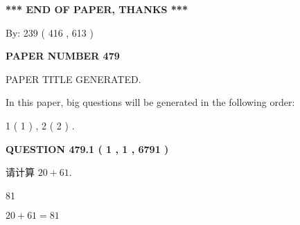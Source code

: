 \documentclass{ctexart}
\begin{document}
   
   
   
\vspace{1.0in} 
{\textbf{\large{ *** END OF PAPER, THANKS *** }}} 
   
   
\hspace{1.0in} By: 
 239 ( 416 ,  613 )
   
   
   
   
\newpage 
\setcounter{page}{ 
   479001 } 
   
   
   
   
 {\textbf{ \Large{ PAPER NUMBER  479  }}}
   
   
\vspace{0.2in}
   
   
   
   
   
   
   
   
 \vspace{0.2in}
 
 
 
 
   
   
 PAPER TITLE GENERATED.
   
   
   
\vspace{0.2in}
   
In this paper, big questions will be generated in the following order: 
   
   
   1 ( 1 )
 ,
   2 ( 2 )
 .
  
\vspace{0.2in}
  
{\textbf{\Large{QUESTION
479.1 
 ( 1 , 1 , 6791 )
}}}
  
  
 
请计算 $ %
20 +  %
61 $.
 
 
 
\noindent{}
 
 

81
 
 
\noindent{}
 
 

 
 
 
\noindent{}
 
 

$ %
20 +  %
61=   %
81$
 
\end{document}
